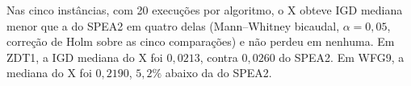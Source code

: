 Nas cinco instâncias, com 20 execuções por algoritmo, o X obteve IGD mediana menor que a do SPEA2 em quatro delas (Mann--Whitney bicaudal, $\alpha = 0{,}05$, correção de Holm sobre as cinco comparações) e não perdeu em nenhuma. Em ZDT1, a IGD mediana do X foi $0{,}0213$, contra $0{,}0260$ do SPEA2. Em WFG9, a mediana do X foi $0{,}2190$, $5{,}2\%$ abaixo da do SPEA2.
